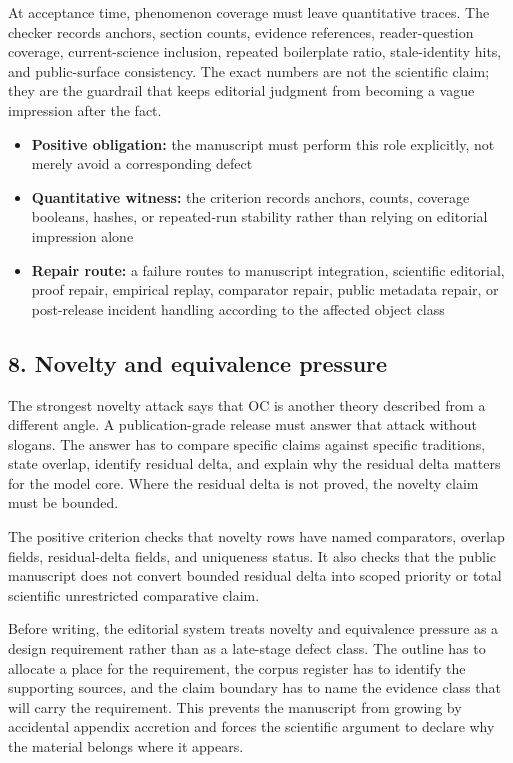 At acceptance time, phenomenon coverage must leave quantitative traces. The checker records anchors, section counts, evidence references, reader-question coverage, current-science inclusion, repeated boilerplate ratio, stale-identity hits, and public-surface consistency. The exact numbers are not the scientific claim; they are the guardrail that keeps editorial judgment from becoming a vague impression after the fact.


\begin{itemize}[leftmargin=1.8em]

\item \textbf{Positive obligation:} the manuscript must perform this role explicitly, not merely avoid a corresponding defect

\item \textbf{Quantitative witness:} the criterion records anchors, counts, coverage booleans, hashes, or repeated-run stability rather than relying on editorial impression alone

\item \textbf{Repair route:} a failure routes to manuscript integration, scientific editorial, proof repair, empirical replay, comparator repair, public metadata repair, or post-release incident handling according to the affected object class

\end{itemize}

\subsection{8. Novelty and equivalence pressure}

The strongest novelty attack says that OC is another theory described from a different angle. A publication-grade release must answer that attack without slogans. The answer has to compare specific claims against specific traditions, state overlap, identify residual delta, and explain why the residual delta matters for the model core. Where the residual delta is not proved, the novelty claim must be bounded.


The positive criterion checks that novelty rows have named comparators, overlap fields, residual-delta fields, and uniqueness status. It also checks that the public manuscript does not convert bounded residual delta into scoped priority or total scientific unrestricted comparative claim.


Before writing, the editorial system treats novelty and equivalence pressure as a design requirement rather than as a late-stage defect class. The outline has to allocate a place for the requirement, the corpus register has to identify the supporting sources, and the claim boundary has to name the evidence class that will carry the requirement. This prevents the manuscript from growing by accidental appendix accretion and forces the scientific argument to declare why the material belongs where it appears.


